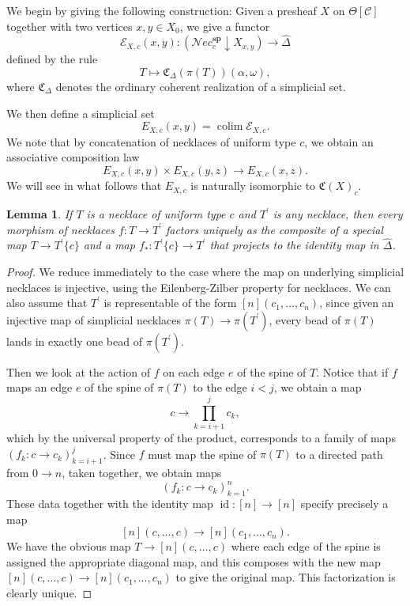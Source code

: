 \documentclass{amsart}
\numberwithin{equation}{section}
\theoremstyle{plain}   %
\newtheorem{lemma}[subsection]{Lemma}
\theoremstyle{remark}
\theoremstyle{plain}
\DeclareMathOperator{\id}{id}
\DeclareMathOperator{\colim}{colim}
\newcommand{\Nec}{\ensuremath{{\mathcal{N}ec}}}
\newcommand{\overcat}[2]{{(#1\downarrow #2)}}
\newcommand{\psh}[1]{\ensuremath{\widehat{#1}}}
\newcommand{\C}{\ensuremath{\mathcal{C}}}
\begin{document}
We begin by giving the following construction: Given a presheaf \(X\) on \(\Theta[\C]\) together with two vertices \(x,y\in X_0\), we give a functor \[\mathcal{E}_{X,c}(x,y):\overcat{\Nec^\mathbf{sp}_c}{X_{x,y}}\to \psh{\Delta}\] defined by the rule \[T\mapsto \mathfrak{C}_\Delta(\pi(T))(\alpha,\omega),\] where \(\mathfrak{C}_\Delta\) denotes the ordinary coherent realization of a simplicial set.

We then define a simplicial set \[E_{X,c}(x,y)=\colim \mathcal{E}_{X,c}.\] We note that by concatenation of necklaces of uniform type \(c\), we obtain an associative composition law \[E_{X,c}(x,y)\times E_{X,c}(y,z)\to E_{X,c}(x,z).\]  We will see in what follows that \(E_{X,c}\) is naturally isomorphic to \(\mathfrak{C}(X)_c\).

\begin{lemma}\label{replemma} If \(T\) is a necklace of uniform type \(c\) and \(T^\prime\) is any necklace, then every morphism of necklaces \(f:T\to T^\prime\) factors uniquely as the composite of a special map \(T\to T^\prime\{c\}\) and a map \(f_*:T^\prime\{c\}\to T^\prime\) that projects to the identity map in \(\psh{\Delta}\).
\end{lemma}
\begin{proof} We reduce immediately to the case where the map on underlying simplicial necklaces is injective, using the Eilenberg-Zilber property for necklaces.  We can also assume that \(T^\prime\) is representable of the form \([n](c_1,\dots,c_n)\), since given an injective map of simplicial necklaces \(\pi(T)\to \pi(T^\prime)\), every bead of \(\pi(T)\) lands in exactly one bead of \(\pi(T^\prime).\)

	Then we look at the action of \(f\) on each edge \(e\) of the spine of \(T\). Notice that if \(f\) maps an edge \(e\) of the spine of \(\pi(T)\) to the edge \(i<j\), we obtain a map \[c\to \prod_{k=i+1}^j c_k,\] which by the universal property of the product, corresponds to a family of maps \((f_k:c\to c_k)_{k=i+1}^j\).  Since \(f\) must map the spine of \(\pi(T)\) to a directed path from \(0\to n\), taken together, we obtain maps \[(f_k:c\to c_k)_{k=1}^n.\] These data together with the identity map \(\id:[n]\to [n]\) specify precisely a map \[[n](c,\dots,c)\to [n](c_1,\dots,c_n).\]  We have the obvious map \(T\to [n](c,\dots,c)\) where each edge of the spine is assigned the appropriate diagonal map, and this composes with the new map \([n](c,\dots,c)\to [n](c_1,\dots,c_n)\) to give the original map. This factorization is clearly unique.
\end{proof}
\end{document}
